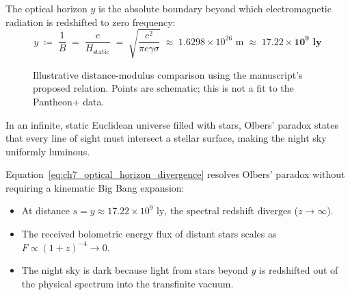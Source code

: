 \documentclass[
    12pt,
    a4paper,
    headings=normal,
    twoside=false,
    open=any,
    parskip=half
]{scrbook}
\begin{document}
\begin{physdefinition}\label{def:ch7_optical_horizon_radius}
The optical horizon $y$ is the absolute boundary beyond which electromagnetic radiation is redshifted to zero frequency:
\begin{equation}
\boxed{y \;\coloneqq\; \frac{1}{B} \;=\; \frac{c}{H_{\text{static}}} \;=\; \sqrt{\frac{c^2}{\pi e \gamma \sigma}} \;\approx\; 1.6298 \times 10^{26} \text{ m} \;\approx\; \mathbf{17.22 \times 10^9 \text{ ly}}}
\label{eq:ch7_optical_horizon_master_formula}
\end{equation}
\end{physdefinition}
\begin{figure}[htbp]\centering
{}
\caption{Illustrative distance-modulus comparison using the manuscript's proposed relation. Points are schematic; this is not a fit to the Pantheon+ data.}\label{fig:ch7_pantheon_distance_modulus}\end{figure}

\begin{physscholion}
In an infinite, static Euclidean universe filled with stars, Olbers' paradox states that every line of sight must intersect a stellar surface, making the night sky uniformly luminous. 

Equation~\eqref{eq:ch7_optical_horizon_divergence} resolves Olbers' paradox without requiring a kinematic Big Bang expansion:
\begin{itemize}[noitemsep]
    \item At distance $s = y \approx 17.22 \times 10^9\text{ ly}$, the spectral redshift diverges ($z \to \infty$).
    \item The received bolometric energy flux of distant stars scales as $F \propto (1 + z)^{-4} \to 0$.
    \item The night sky is dark because light from stars beyond $y$ is redshifted out of the physical spectrum into the transfinite vacuum.
\end{itemize}
\end{physscholion}
\end{document}
